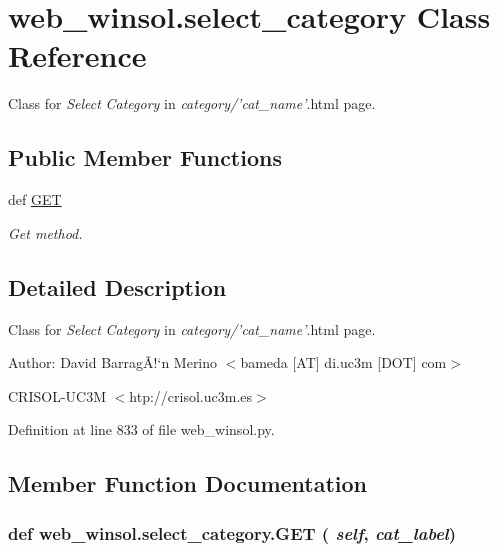\hypertarget{classweb__winsol_1_1select__category}{
\section{web\_\-winsol.select\_\-category Class Reference}
\label{classweb__winsol_1_1select__category}
}
Class for {\em Select\/} {\em Category\/} in {\em category/'cat\_\-name'\/}.html page.  


\subsection*{Public Member Functions}
\begin{CompactItemize}
\item 
def \hyperlink{classweb__winsol_1_1select__category_13988d3d839676ba26413f3d5a52918d}{GET}
\begin{CompactList}\small\item\em Get method. \item\end{CompactList}\end{CompactItemize}


\subsection{Detailed Description}
Class for {\em Select\/} {\em Category\/} in {\em category/'cat\_\-name'\/}.html page. 

\begin{Desc}
\item[Author:]David Barrag\~{A}!`n Merino $<$bameda \mbox{[}AT\mbox{]} di.uc3m \mbox{[}DOT\mbox{]} com$>$ 

CRISOL-UC3M $<$htp://crisol.uc3m.es$>$ \end{Desc}




Definition at line 833 of file web\_\-winsol.py.

\subsection{Member Function Documentation}
\hypertarget{classweb__winsol_1_1select__category_13988d3d839676ba26413f3d5a52918d}{
\subsubsection[GET]{\setlength{\rightskip}{0pt plus 5cm}def web\_\-winsol.select\_\-category.GET ( {\em self},  {\em cat\_\-label})}}
\label{classweb__winsol_1_1select__category_13988d3d839676ba26413f3d5a52918d}


